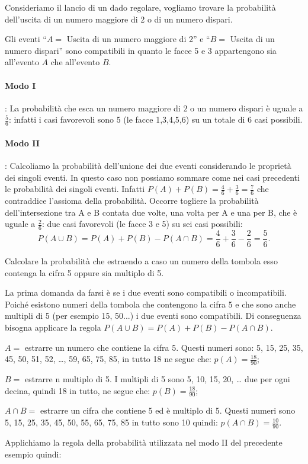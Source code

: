 \begin{exrig}
\begin{esempio}
Consideriamo il lancio di un dado regolare, vogliamo trovare la probabilità dell'uscita di un numero maggiore di 2 o di un numero dispari.

Gli eventi ``$ A= $ Uscita di un numero maggiore di 2'' e ``$ B= $ Uscita di un numero dispari'' sono compatibili in quanto le facce 5 e 3 appartengono sia all'evento $A$ che all'evento $B$.
\begin{center}
 
\end{center}
\paragraph{Modo I}: La probabilità che esca un numero maggiore di $2$ o un numero dispari è uguale a $\frac 5 6$: infatti i casi favorevoli sono 5 (le facce 1,3,4,5,6) su un totale di $6$ casi possibili.
\paragraph{Modo II}: Calcoliamo la probabilità dell'unione dei due eventi considerando le proprietà dei singoli eventi. In questo caso non possiamo sommare come nei casi precedenti le probabilità dei singoli eventi. Infatti $P(A)+P(B)=\frac 4 6+\frac 3 6=\frac 7 6$ che contraddice l'assioma della probabilità. Occorre togliere la probabilità dell'intersezione tra A e B contata due volte, una volta per A e una per B, che è uguale a $\frac 2 6$: due casi favorevoli (le facce 3 e 5) su sei casi possibili: \[P(A\cup B)=P(A)+P(B)-P(A\cap B)=\frac 4 6+\frac 3 6-\frac 2 6=\frac 5 6.\]
\end{esempio}

\begin{esempio}
Calcolare la probabilità che estraendo a caso un numero della tombola esso contenga la cifra 5 oppure sia multiplo di 5.

La prima domanda da farsi è se i due eventi sono compatibili o incompatibili. Poiché esistono numeri della tombola che contengono la cifra 5 e che sono anche multipli di 5 (per esempio 15, 50...) i due eventi sono compatibili. Di conseguenza bisogna applicare la regola $P(A\cup B)=P(A)+P(B)-P(A\cap B)$.
\begin{itemize*}
\item $ A = $ estrarre un numero che contiene la cifra 5. Questi numeri sono: 5, 15, 25, 35, 45, 50, 51, 52, …, 59, 65, 75, 85, in tutto 18 ne segue che: $p(A)=\frac{18}{90}$;
\item $ B = $ estrarre n multiplo di 5. I multipli di 5 sono 5, 10, 15, 20, … due per ogni decina, quindi 18 in tutto, ne segue che: $p(B)=\frac{18}{90}$;
\item $A\cap B =$ estrarre un cifra che contiene 5 ed è multiplo di 5. Questi numeri sono 5, 15, 25, 35, 45, 50, 55, 65, 75, 85 in tutto sono 10 quindi: $p(A\cap B)=\frac{10}{90}$.
\end{itemize*}
Applichiamo la regola della probabilità utilizzata nel modo II del precedente esempio quindi:


\end{esempio}
\end{exrig}
